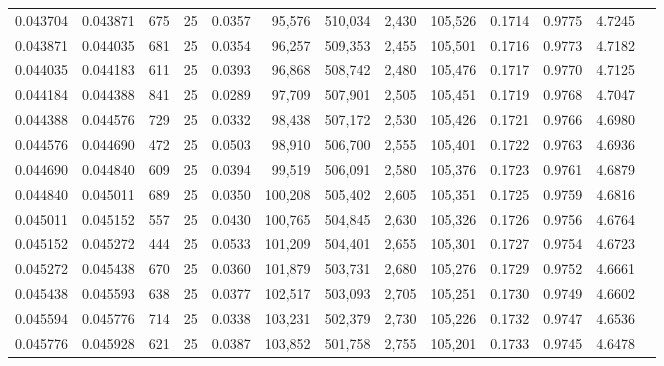 \begin{tabular}{rrrrrrrrrrrrr}
0.043704 & 0.043871 &   675 &  25 &                                     0.0357 &  95,576 & 510,034 &   2,430 & 105,526 & 0.1714 & 0.9775 & 4.7245 \\
0.043871 & 0.044035 &   681 &  25 &                                     0.0354 &  96,257 & 509,353 &   2,455 & 105,501 & 0.1716 & 0.9773 & 4.7182 \\
0.044035 & 0.044183 &   611 &  25 &                                     0.0393 &  96,868 & 508,742 &   2,480 & 105,476 & 0.1717 & 0.9770 & 4.7125 \\
0.044184 & 0.044388 &   841 &  25 &                                     0.0289 &  97,709 & 507,901 &   2,505 & 105,451 & 0.1719 & 0.9768 & 4.7047 \\
0.044388 & 0.044576 &   729 &  25 &                                     0.0332 &  98,438 & 507,172 &   2,530 & 105,426 & 0.1721 & 0.9766 & 4.6980 \\
0.044576 & 0.044690 &   472 &  25 &                                     0.0503 &  98,910 & 506,700 &   2,555 & 105,401 & 0.1722 & 0.9763 & 4.6936 \\
0.044690 & 0.044840 &   609 &  25 &                                     0.0394 &  99,519 & 506,091 &   2,580 & 105,376 & 0.1723 & 0.9761 & 4.6879 \\
0.044840 & 0.045011 &   689 &  25 &                                     0.0350 & 100,208 & 505,402 &   2,605 & 105,351 & 0.1725 & 0.9759 & 4.6816 \\
0.045011 & 0.045152 &   557 &  25 &                                     0.0430 & 100,765 & 504,845 &   2,630 & 105,326 & 0.1726 & 0.9756 & 4.6764 \\
0.045152 & 0.045272 &   444 &  25 &                                     0.0533 & 101,209 & 504,401 &   2,655 & 105,301 & 0.1727 & 0.9754 & 4.6723 \\
0.045272 & 0.045438 &   670 &  25 &                                     0.0360 & 101,879 & 503,731 &   2,680 & 105,276 & 0.1729 & 0.9752 & 4.6661 \\
0.045438 & 0.045593 &   638 &  25 &                                     0.0377 & 102,517 & 503,093 &   2,705 & 105,251 & 0.1730 & 0.9749 & 4.6602 \\
0.045594 & 0.045776 &   714 &  25 &                                     0.0338 & 103,231 & 502,379 &   2,730 & 105,226 & 0.1732 & 0.9747 & 4.6536 \\
0.045776 & 0.045928 &   621 &  25 &                                     0.0387 & 103,852 & 501,758 &   2,755 & 105,201 & 0.1733 & 0.9745 & 4.6478 \\

\end{tabular}

